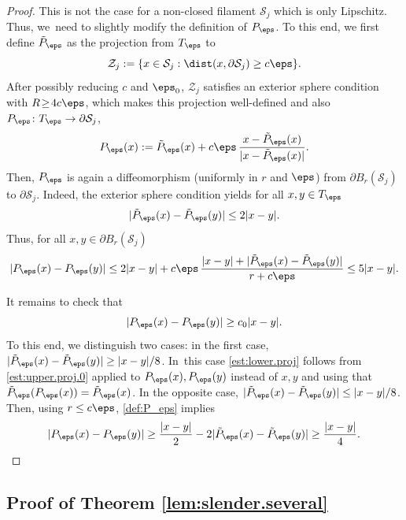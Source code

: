 \begin{proof}
This is not the case for a non-closed filament $\mathcal S_j$ which is only Lipschitz. Thus, we~need to slightly modify the definition of $P_\eps$. To this end, we first define $\tilde P_\eps$ as the projection from $T_\eps$ to \begin{equation}
\mathcal Z_j := \{ x \in \mathcal S_j : \dist(x,\partial \mathcal S_j) \geq c \eps \}.
\end{equation}
After possibly reducing $c$ and $\eps_0$, $\mathcal Z_j$ satisfies an exterior sphere condition with \hbox{$R\!\geq\!4 c \eps$}, which makes this projection well-defined and also $P_\eps \colon T_\eps \to \partial \mathcal S_j$,
\begin{equation} \label{def:P_eps}
P_\eps(x) := \tilde P_\eps (x) + c \eps\, \frac{x - \tilde P_\eps (x)}{|x -\tilde P_\eps (x)|}.
\end{equation}
Then, $P_\eps$ is again a diffeomorphism (uniformly in $r$ and $\eps$) from $\partial B_r(\mathcal S_j)$ to $\partial \mathcal S_j$.
Indeed, the exterior sphere condition yields for all $x,y \in T_\eps$
\begin{equation} \label{est:upper.proj.0}
|\tilde P_\eps(x) - \tilde P_\eps(y)| \leq 2 |x-y|.
\end{equation}
Thus, for all $x,y \in \partial B_r(\mathcal S_j)$
\begin{equation*}
|P_\eps(x) - P_\eps(y)| \leq 2 |x-y| + c \eps\, \frac{|x - y| + |\tilde P_\eps (x) - \tilde P_\eps (y)|}{r + c \eps} \leq 5 |x-y|.
\end{equation*}

It remains to check that
\begin{equation} \label{est:lower.proj}
|P_\eps(x) - P_\eps(y)| \geq c_0 |x-y|.
\end{equation}
To this end, we distinguish two cases: in the first case, $|\tilde P_\eps(x) - \tilde P_\eps(y)| \geq |x - y|/8$. In~this case \eqref{est:lower.proj} follows from \eqref{est:upper.proj.0} applied to $P_\eps(x), P_\eps(y)$ instead of $x,y$ and using that $\tilde P_\eps(P_\eps(x)) = \tilde P_\eps(x)$.
In the opposite case, $|\tilde P_\eps(x) - \tilde P_\eps(y)| \leq |x - y|/8$.
Then, using $r \leq c \eps$, \eqref{def:P_eps} implies
\begin{equation*}
|P_\eps(x) - P_\eps(y)| \geq \frac {|x-y|}2 - 2|\tilde P_\eps(x) - \tilde P_\eps(y)| \geq \frac {|x-y|}4.\qedhere
\end{equation*}
\end{proof}

\subsection{Proof of Theorem \ref{lem:slender.several}} \label{zeveryproof}

